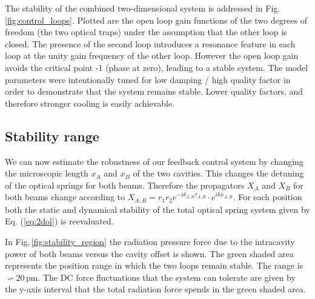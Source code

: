 The stability of the combined two-dimensional system is addressed in Fig.\,\ref{fig:control_loops}. Plotted are the open loop gain functions of the two degrees of freedom (the two optical traps) under the assumption that the other loop is closed. The presence of the second loop introduces a resonance feature in each loop at the unity gain frequency of the other loop. However the open loop gain avoids the critical point -1 (phase at zero), leading to a stable system. The model parameters were intentionally tuned for low damping / high quality factor in order to demonstrate that the system remains stable. Lower quality factors, and therefore stronger cooling is easily achievable.



\subsection{Stability range}
\label{sec:stability}
%
We can now estimate the robustness of our feedback control system 
by changing the microscopic length $x_A$ and $x_B$ of the two cavities. This changes the detuning of the optical springs for both beams. Therefore the propagators $X_A$ and $X_B$ for both beams change according to $X_{A,B}=r_1r_2 e^{-i\delta_{A,B}\tau_{A,B}}\cdot e^{ikx_{A,B}}$. For each position both the static and dynamical stability of the total optical spring system given by Eq. (\ref{eq:2dol}) is reevaluated.

In Fig.\,\ref{fig:stability_region} the radiation pressure force due to the intracavity power of both beams
versus the cavity offset is shown. The green shaded area represents the position range in which the two loops remain stable.  The range is $\backsim 20\,$pm. 
The DC force fluctuations that the system can tolerate are given by the y-axis interval that the total radiation force spends in the green shaded area. 

